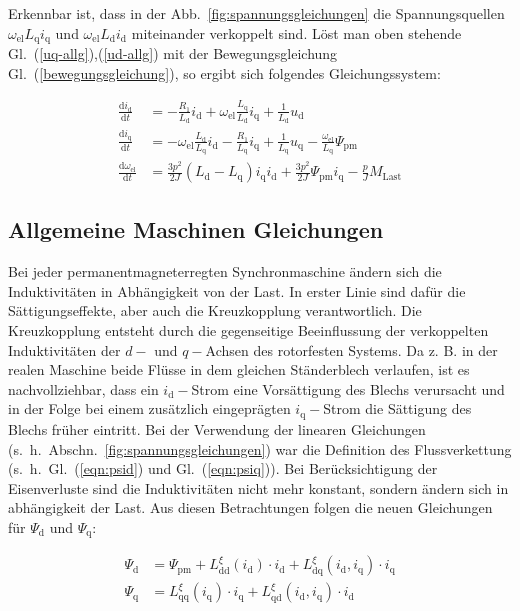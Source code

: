\documentclass[conference,twocolumn]{IEEEtran}
\newcommand{\x}[1]{\mathrm{#1}}
\begin{document}
Erkennbar ist, dass in der Abb.~\ref{fig:spannungsgleichungen} die Spannungsquellen $\omega_\x{el} L_\x{q} i_\x{q}$ und $\omega_\x{el} L_\x{d} i_\x{d}$ miteinander verkoppelt sind.
Löst man oben stehende Gl.~(\ref{uq-allg}),(\ref{ud-allg}) mit der Bewegungsgleichung Gl.~(\ref{bewegungsgleichung}), so ergibt sich folgendes Gleichungssystem:

\begin{align}
\frac{\x{d}i_\x{d}}{\x{d}t} &= -\frac{R_\x{1}}{L_\x{d}}i_\x{d}+\omega_\x{el}\frac{L_\x{q}}{L_\x{d}}i_\x{q}+\frac{1}{L_\x{d}}u_\x{d} \\
\frac{\x{d}i_\x{q}}{\x{d}t} &= -\omega_\x{el}\frac{L_\x{d}}{L_\x{q}}i_\x{d} - \frac{R_\x{1}}{L_\x{q}}i_\x{q} + \frac{1}{L_\x{q}}u_\x{q} - \frac{\omega_\x{el}}{L_\x{q}}\Psi_\x{pm} \\
\frac{\x{d}\omega_\x{el}}{\x{d}t} &= \frac{3p^2}{2J}(L_\x{d} - L_\x{q})i_\x{q} i_\x{d} + \frac{3p^2}{2J} \Psi_\x{pm} i_\x{q} - \frac{p}{J} M_\x{Last}
\end{align}

\subsection{Allgemeine Maschinen Gleichungen}\label{sec:allg-gleichungen}

Bei jeder permanentmagneterregten Synchronmaschine ändern sich die Induktivitäten in Abhängigkeit von der Last.
In erster Linie sind dafür die Sättigungseffekte, aber auch die Kreuzkopplung verantwortlich.
Die Kreuzkopplung entsteht durch die gegenseitige Beeinflussung der verkoppelten Induktivitäten der $d-$ und $q-$Achsen des rotorfesten Systems.
Da z. B. in der realen Maschine beide Flüsse in dem gleichen Ständerblech verlaufen, ist es nachvollziehbar, dass ein $i_\x{d}-$Strom eine Vorsättigung des Blechs verursacht und in der Folge bei einem zusätzlich eingeprägten $i_\x{q}-$Strom die Sättigung des Blechs früher eintritt.
Bei der Verwendung der linearen Gleichungen (s.~h.~Abschn.~\ref{fig:spannungsgleichungen}) war die Definition des Flussverkettung (s.~h.~Gl.~(\ref{eqn:psid}) und Gl.~(\ref{eqn:psiq})).
Bei Berücksichtigung der Eisenverluste sind die Induktivitäten nicht mehr konstant, sondern ändern sich in abhängigkeit der Last.
Aus diesen Betrachtungen folgen die neuen Gleichungen für $\Psi_\x{d}$ und $\Psi_\x{q}$:

\begin{align}
\Psi_\x{d} &= \Psi_\x{pm} + L_\x{dd}^{\xi}(i_\x{d})\cdot i_\x{d} + L_\x{dq}^{\xi}(i_\x{d} ,i_\x{q})\cdot i_\x{q} \\
\Psi_\x{q} &= L_\x{qq}^{\xi}(i_\x{q})\cdot i_\x{q} + L_\x{qd}^{\xi}(i_\x{d} ,i_\x{q})\cdot i_\x{d}
\end{align}
\end{document}

